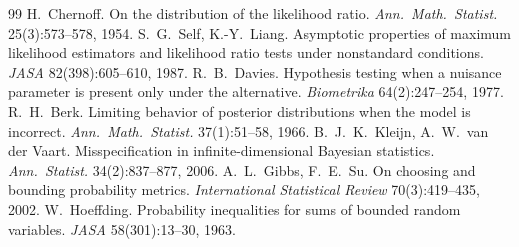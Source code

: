 \documentclass[11pt]{article}
\theoremstyle{definition}
\theoremstyle{remark}
\begin{document}
\begin{thebibliography}{99}
 H.~Chernoff. On the distribution of the likelihood ratio. \emph{Ann.\ Math.\ Statist.} 25(3):573--578, 1954.
 S.~G.~Self, K.-Y.~Liang. Asymptotic properties of maximum likelihood estimators and likelihood ratio tests under nonstandard conditions. \emph{JASA} 82(398):605--610, 1987.
 R.~B.~Davies. Hypothesis testing when a nuisance parameter is present only under the alternative. \emph{Biometrika} 64(2):247--254, 1977.
 R.~H.~Berk. Limiting behavior of posterior distributions when the model is incorrect. \emph{Ann.\ Math.\ Statist.} 37(1):51--58, 1966.
 B.~J.~K.~Kleijn, A.~W.~van der Vaart. Misspecification in infinite-dimensional Bayesian statistics. \emph{Ann.\ Statist.} 34(2):837--877, 2006.
 A.~L.~Gibbs, F.~E.~Su. On choosing and bounding probability metrics. \emph{International Statistical Review} 70(3):419--435, 2002.
 W.~Hoeffding. Probability inequalities for sums of bounded random variables. \emph{JASA} 58(301):13--30, 1963.
\end{thebibliography}
\end{document}
